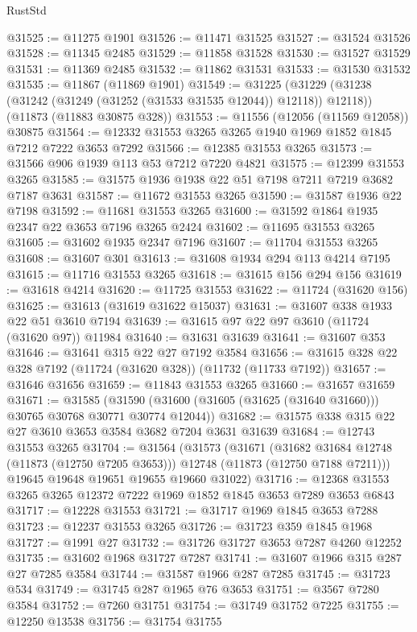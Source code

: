\begin{lexlean}{RustStd}
\begin{coremodule}
@31525 := @11275 @1901
@31526 := @11471 @31525
@31527 := @31524 @31526
@31528 := @11345 @2485
@31529 := @11858 @31528
@31530 := @31527 @31529
@31531 := @11369 @2485
@31532 := @11862 @31531
@31533 := @31530 @31532
@31535 := @11867 (@11869 @1901)
@31549 := @31225
    (@31229 (@31238 (@31242 (@31249 (@31252 (@31533 @31535 @12044)) @12118)) @12118))
    (@11873 (@11883 @30875 @328))
@31553 := @11556 (@12056 (@11569 @12058)) @30875
@31564 := @12332 @31553 @3265 @3265 @1940 @1969 @1852 @1845 @7212 @7222 @3653 @7292
@31566 := @12385 @31553 @3265
@31573 := @31566 @906 @1939 @113 @53 @7212 @7220 @4821
@31575 := @12399 @31553 @3265
@31585 := @31575 @1936 @1938 @22 @51 @7198 @7211 @7219 @3682 @7187 @3631
@31587 := @11672 @31553 @3265
@31590 := @31587 @1936 @22 @7198
@31592 := @11681 @31553 @3265
@31600 := @31592 @1864 @1935 @2347 @22 @3653 @7196 @3265 @2424
@31602 := @11695 @31553 @3265
@31605 := @31602 @1935 @2347 @7196
@31607 := @11704 @31553 @3265
@31608 := @31607 @301
@31613 := @31608 @1934 @294 @113 @4214 @7195
@31615 := @11716 @31553 @3265
@31618 := @31615 @156 @294 @156
@31619 := @31618 @4214
@31620 := @11725 @31553
@31622 := @11724 (@31620 @156)
@31625 := @31613 (@31619 @31622 @15037)
@31631 := @31607 @338 @1933 @22 @51 @3610 @7194
@31639 := @31615 @97 @22 @97 @3610 (@11724 (@31620 @97)) @11984
@31640 := @31631 @31639
@31641 := @31607 @353
@31646 := @31641 @315 @22 @27 @7192 @3584
@31656 := @31615 @328 @22 @328 @7192 (@11724 (@31620 @328)) (@11732 (@11733 @7192))
@31657 := @31646 @31656
@31659 := @11843 @31553 @3265
@31660 := @31657 @31659
@31671 := @31585
    (@31590 (@31600 (@31605 (@31625 (@31640 @31660))) @30765 @30768 @30771 @30774 @12044))
@31682 := @31575 @338 @315 @22 @27 @3610 @3653 @3584 @3682 @7204 @3631 @31639
@31684 := @12743 @31553 @3265
@31704 := @31564
    (@31573
      (@31671
        (@31682 @31684 @12748 (@11873 (@12750 @7205 @3653)))
        @12748
        (@11873 (@12750 @7188 @7211)))
      @19645
      @19648
      @19651
      @19655
      @19660
      @31022)
@31716 := @12368 @31553 @3265 @3265 @12372 @7222 @1969 @1852 @1845 @3653 @7289 @3653 @6843
@31717 := @12228 @31553
@31721 := @31717 @1969 @1845 @3653 @7288
@31723 := @12237 @31553 @3265
@31726 := @31723 @359 @1845 @1968
@31727 := @1991 @27
@31732 := @31726 @31727 @3653 @7287 @4260 @12252
@31735 := @31602 @1968 @31727 @7287
@31741 := @31607 @1966 @315 @287 @27 @7285 @3584
@31744 := @31587 @1966 @287 @7285
@31745 := @31723 @534
@31749 := @31745 @287 @1965 @76 @3653
@31751 := @3567 @7280 @3584
@31752 := @7260 @31751
@31754 := @31749 @31752 @7225
@31755 := @12250 @13538
@31756 := @31754 @31755

\end{coremodule}
\end{lexlean}
